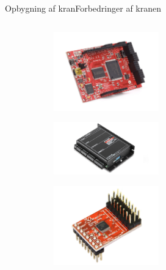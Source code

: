 \begin{frame}{Opbygning af kran}{Forbedringer af kranen}
\begin{columns}[T]
\begin{column}{.65\textwidth}
\vspace{-0.7cm}
\begin{figure}[H]
  \centering
{}  \begin{subfigure}{0.98\textwidth}
        \centering
        \includegraphics[width=0.5\textwidth]{Billeder/Papilio_DUO}
        \end{subfigure}
  \begin{subfigure}{0.98\textwidth}
        \centering
        \includegraphics[width=0.5\textwidth]{Billeder/Escon_fig}
        \end{subfigure}
  \begin{subfigure}{0.98\textwidth}
        \centering
        \includegraphics[width=0.5\textwidth]{Billeder/Analog_wing}
        \end{subfigure}     
\end{figure}

\end{column}
\end{columns}

  \end{frame}



